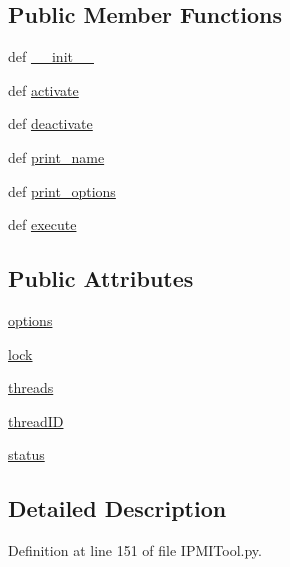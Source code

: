 \subsection*{Public Member Functions}
\begin{DoxyCompactItemize}
\item 
def \hyperlink{class_i_p_m_i_tool_1_1_i_p_m_i_tool_a5de40b2861cf82d75b68d65a00f56fd7}{\-\_\-\-\_\-init\-\_\-\-\_\-}
\item 
def \hyperlink{class_i_p_m_i_tool_1_1_i_p_m_i_tool_a7033e64733a6165c392c71159c75405c}{activate}
\item 
def \hyperlink{class_i_p_m_i_tool_1_1_i_p_m_i_tool_a7639dc29d494f89f9cd00c164984a014}{deactivate}
\item 
def \hyperlink{class_i_p_m_i_tool_1_1_i_p_m_i_tool_ad99bf0f2639b3f838e1c94efd64e24ad}{print\-\_\-name}
\item 
def \hyperlink{class_i_p_m_i_tool_1_1_i_p_m_i_tool_a40df31a86acffb30ca43ab938bd936ab}{print\-\_\-options}
\item 
def \hyperlink{class_i_p_m_i_tool_1_1_i_p_m_i_tool_a308c802b6dcf01604da2538f72cb2126}{execute}
\end{DoxyCompactItemize}
\subsection*{Public Attributes}
\begin{DoxyCompactItemize}
\item 
\hyperlink{class_i_p_m_i_tool_1_1_i_p_m_i_tool_a9f0f9484b1b8f6a0df8338f7894c8823}{options}
\item 
\hyperlink{class_i_p_m_i_tool_1_1_i_p_m_i_tool_a36a9429fca7200e0a6d1d78002b95d11}{lock}
\item 
\hyperlink{class_i_p_m_i_tool_1_1_i_p_m_i_tool_a2f6ca8b0b509ba2c514b72312841b2d6}{threads}
\item 
\hyperlink{class_i_p_m_i_tool_1_1_i_p_m_i_tool_aaa15d2dc90d9e3a45adc4519912c811d}{thread\-I\-D}
\item 
\hyperlink{class_i_p_m_i_tool_1_1_i_p_m_i_tool_a4dba85133ceca9edff481c575cb468d9}{status}
\end{DoxyCompactItemize}


\subsection{Detailed Description}


Definition at line 151 of file I\-P\-M\-I\-Tool.\-py.



